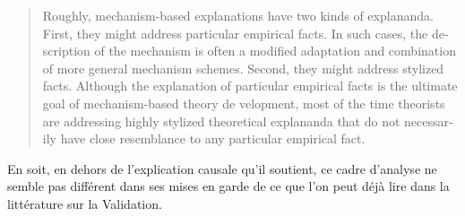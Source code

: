 \foreignblockquote{english}[\cite{Hedstrom2010}]{Roughly, mechanism-based explanations have two kinds of explananda. First, they might address particular empirical facts. In such cases, the description of the mechanism is often a modified adaptation and combination of more general mechanism schemes. Second, they might address stylized facts. Although the explanation of particular empirical facts is the ultimate goal of mechanism-based theory de velopment, most of the time theorists are addressing highly stylized theoretical explananda that do not necessarily have close resemblance to any particular empirical fact. }

En soit, en dehors de l'explication causale qu'il soutient, ce cadre d'analyse ne semble pas différent dans ses mises en garde de ce que l'on peut déjà lire dans la littérature sur la Validation. %



